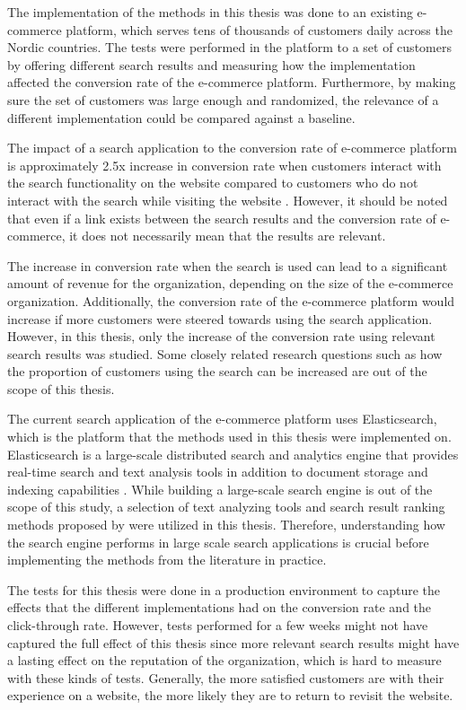 The implementation of the methods in this thesis was done to an existing e-commerce platform, 
which serves tens of thousands of customers daily across the Nordic countries. 
The tests were performed in the platform to a set of customers by offering different search results 
and measuring how the implementation affected the conversion rate of the e-commerce platform.
Furthermore, by making sure the set of customers was large enough and randomized, 
the relevance of a different implementation could be compared against a baseline.


The impact of a search application to the conversion rate of e-commerce platform is 
approximately 2.5x increase in conversion rate
when customers interact with the search functionality on the website compared to
customers who do not interact with the search while visiting the website \cite{powerAnalytics}.
However, it should be noted that even if a link exists between the search results and the conversion 
rate of e-commerce, it does not necessarily mean that the results are relevant.


The increase in conversion rate when the search is used can lead to 
a significant amount of revenue for the organization, depending on the size of the e-commerce organization.
Additionally, the conversion rate of the e-commerce platform would increase if more customers were steered towards
using the search application.
However, in this thesis, only the increase of the conversion rate using relevant search results was studied.
Some closely related research questions such as
how the proportion of customers using the search can be increased are out of the scope of this thesis.


The current search application of the e-commerce platform uses Elasticsearch, which is
the platform that the methods used in this thesis were implemented on.
Elasticsearch is a large-scale distributed search and analytics engine that provides 
real-time search and text analysis tools in addition to document storage and indexing capabilities 
\cite{elasticIntro, relevantSearch}.
While building a large-scale search engine is out of the scope of this study, 
a selection of text analyzing tools and search result ranking methods proposed by 
\citeauthor{relevantSearch} \cite{relevantSearch} were utilized in this thesis.
Therefore, understanding how the search engine performs in large scale search applications 
is crucial before implementing the methods from the literature in practice.


The tests for this thesis were done in a production environment to capture the 
effects that the different implementations had on the conversion rate and the click-through rate.
However, tests performed for a few weeks might not have captured the full effect of this thesis 
since more relevant search results might have a lasting effect on the reputation of the organization, 
which is hard to measure with these kinds of tests. 
Generally, the more satisfied customers are with their experience on a website, 
the more likely they are to return to revisit the website.


